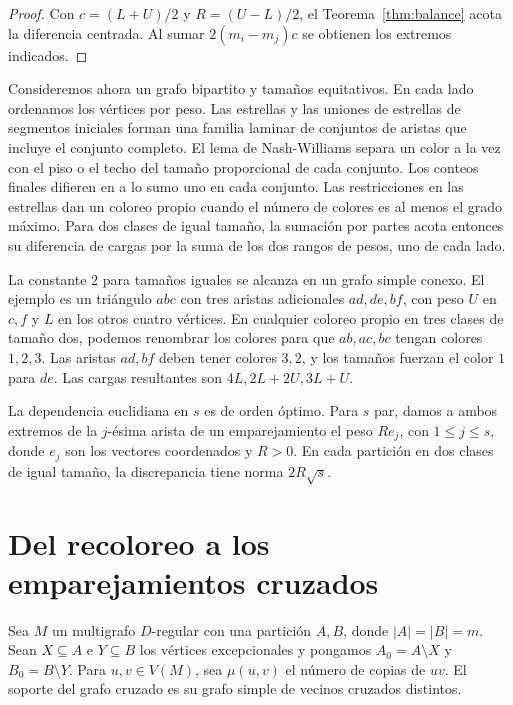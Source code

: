\documentclass[11pt]{article}
\begin{document}
\begin{proof}
Con \(c=(L+U)/2\) y \(R=(U-L)/2\), el Teorema~\ref{thm:balance} acota la diferencia centrada. Al sumar \(2(m_i-m_j)c\) se obtienen los extremos indicados.
\end{proof}

Consideremos ahora un grafo bipartito y tamaños equitativos. En cada lado ordenamos los vértices por peso. Las estrellas y las uniones de estrellas de segmentos iniciales forman una familia laminar de conjuntos de aristas que incluye el conjunto completo. El lema de Nash-Williams \cite{NashWilliams} separa un color a la vez con el piso o el techo del tamaño proporcional de cada conjunto. Los conteos finales difieren en a lo sumo uno en cada conjunto. Las restricciones en las estrellas dan un coloreo propio cuando el número de colores es al menos el grado máximo. Para dos clases de igual tamaño, la sumación por partes acota entonces su diferencia de cargas por la suma de los dos rangos de pesos, uno de cada lado.

La constante \(2\) para tamaños iguales se alcanza en un grafo simple conexo. El ejemplo es un triángulo \(abc\) con tres aristas adicionales \(ad,de,bf\), con peso \(U\) en \(c,f\) y \(L\) en los otros cuatro vértices. En cualquier coloreo propio en tres clases de tamaño dos, podemos renombrar los colores para que \(ab,ac,bc\) tengan colores \(1,2,3\). Las aristas \(ad,bf\) deben tener colores \(3,2\), y los tamaños fuerzan el color \(1\) para \(de\). Las cargas resultantes son \(4L,2L+2U,3L+U\).

La dependencia euclidiana en \(s\) es de orden óptimo. Para \(s\) par, damos a ambos extremos de la \(j\)-ésima arista de un emparejamiento el peso \(Re_j\), con \(1\le j\le s\), donde \(e_j\) son los vectores coordenados y \(R>0\). En cada partición en dos clases de igual tamaño, la discrepancia tiene norma \(2R\sqrt{s}\).

\section{Del recoloreo a los emparejamientos cruzados}\label{sec:cross}

Sea \(M\) un multigrafo \(D\)-regular con una partición \(A,B\), donde \(|A|=|B|=m\). Sean \(X\subseteq A\) e \(Y\subseteq B\) los vértices excepcionales y pongamos \(A_0=A\setminus X\) y \(B_0=B\setminus Y\). Para \(u,v\in V(M)\), sea \(\mu(u,v)\) el número de copias de \(uv\). El soporte del grafo cruzado es su grafo simple de vecinos cruzados distintos.
\end{document}
